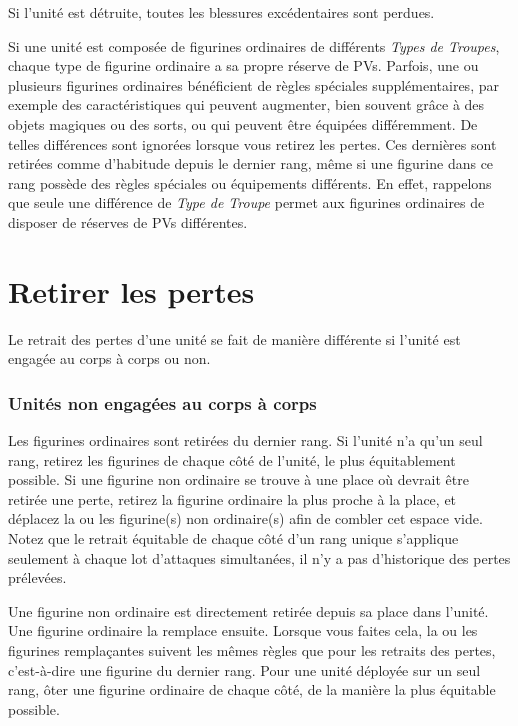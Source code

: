 Si l'unité est détruite, toutes les blessures excédentaires sont perdues.

Si une unité est composée de figurines ordinaires de différents \emph{Types de Troupes}, chaque type de figurine ordinaire a sa propre réserve de PVs. 
Parfois, une ou plusieurs figurines ordinaires bénéficient de règles spéciales supplémentaires, par exemple des caractéristiques qui peuvent augmenter, bien souvent grâce à des objets magiques ou des sorts, ou qui peuvent être équipées différemment. De telles différences sont ignorées lorsque vous retirez les pertes. Ces dernières sont retirées comme d'habitude depuis le dernier rang, même si une figurine dans ce rang possède des règles spéciales ou équipements différents. En effet, rappelons que seule une différence de \emph{Type de Troupe} permet aux figurines ordinaires de disposer de réserves de PVs différentes. 

\section{Retirer les pertes}

Le retrait des pertes d'une unité se fait de manière différente si l'unité est engagée au corps à corps ou non. 

\subsubsection*{Unités non engagées au corps à corps}

Les figurines ordinaires sont retirées du dernier rang. Si l'unité n'a qu'un seul rang, retirez les figurines de chaque côté de l'unité, le plus équitablement possible. Si une figurine non ordinaire se trouve à une place où devrait être retirée une perte, retirez la figurine ordinaire la plus proche à la place, et déplacez la ou les figurine(s) non ordinaire(s) afin de combler cet espace vide. Notez que le retrait équitable de chaque côté d'un rang unique s'applique seulement à chaque lot d'attaques simultanées, il n'y a pas d'historique des pertes prélevées.

Une figurine non ordinaire est directement retirée depuis sa place dans l'unité. Une figurine ordinaire la remplace ensuite. Lorsque vous faites cela, la ou les figurines remplaçantes suivent les mêmes règles que pour les retraits des pertes, c'est-à-dire une figurine du dernier rang. Pour une unité déployée sur un seul rang, ôter une figurine ordinaire de chaque côté, de la manière la plus équitable possible.

